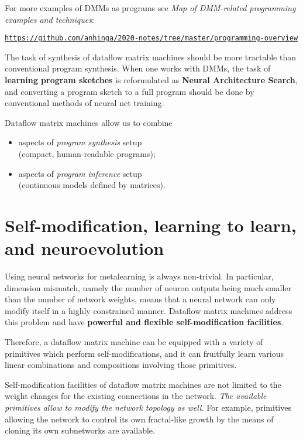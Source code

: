 \documentclass{article}
\begin{document}
For more examples of DMMs as programs see {\em Map of DMM-related programming examples and techniques}: 

\hspace{0.3in}\href{https://github.com/anhinga/2020-notes/tree/master/programming-overview}{\tt https://github.com/anhinga/2020-notes/tree/master/programming-overview}

\vspace{0.1in}
The task of synthesis of dataflow matrix machines
should be more tractable than conventional program synthesis. When one works with DMMs, the task of
{\bf learning program sketches} is reformulated as {\bf Neural Architecture Search},
and converting a program sketch to a full program should be done by
conventional methods of neural net training. 

\vspace{0.1in}
\noindent
Dataflow matrix machines allow us  to combine

  \begin{itemize}
      \item aspects of {\em program synthesis} setup\\ (compact, human-readable programs);
      \item aspects of {\em program inference} setup\\ (continuous models defined by matrices).
  \end{itemize}

\section{Self-modification, learning to learn, and neuroevolution} \label{sec:selfref}

Using neural networks for metalearning
is always non-trivial. In particular, dimension mismatch, namely the number of neuron outputs 
being much smaller than the number of network weights,
means that a neural network
can only modify itself in a highly constrained manner. Dataflow matrix machines address
this problem and have {\bf powerful and flexible self-modification facilities}.

Therefore, a dataflow matrix machine can be equipped with a variety of primitives
which perform self-modifications, and it can fruitfully learn various linear combinations and
compositions involving those primitives.

Self-modification facilities of dataflow matrix machines are not limited to the weight
changes for the existing connections in the network. {\em The available primitives allow to
modify the network topology as well.} For example, primitives allowing the network
to control its own fractal-like growth by the means of cloning its own subnetworks
are available.
\end{document}
